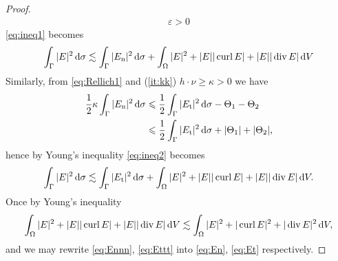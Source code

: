 \begin{proof}
\begin{align*}
    \varepsilon>0
  \end{align*}
  \eqref{eq:ineq1} becomes
  \begin{align}
    \int_{\Gamma}|E|^2\,\text{d}\sigma\lesssim\int_{\Gamma}|E_{\text{n}}|^2\,\text{d}\sigma+\int_{\Omega}|E|^2+|E||\operatorname{curl} E|+|E||\operatorname{div} E|\,\text{d}V
    \label{eq:Ennn}
  \end{align}
  Similarly, from \eqref{eq:Rellich1} and (\ref{it:kk}) $h\cdot\nu\geqslant\kappa>0$  we have
  \begin{equation}\label{eq:ineq2}
    \begin{split}
      \frac{1}{2}\kappa\int_{\Gamma}|E_{\text{n}}|^2\,\text{d}\sigma 
      &\leqslant \frac{1}{2}\int_{\Gamma}|E_{\text{t}}|^2\,\text{d}\sigma-\Theta_1-\Theta_2\\
      &\leqslant\frac{1}{2}\int_{\Gamma}|E_{\text{t}}|^2\,\text{d}\sigma+|\Theta_1|+|\Theta_2|,
    \end{split}
  \end{equation}
  hence by Young's inequality \eqref{eq:ineq2} becomes
  \begin{align}
    \int_{\Gamma}|E|^2\,\text{d}\sigma\lesssim\int_{\Gamma}|E_{\text{t}}|^2\,\text{d}\sigma+\int_{\Omega}|E|^2+|E||\operatorname{curl} E|+|E||\operatorname{div} E|\,\text{d}V
    \label{eq:Ettt}.
  \end{align}
  Once by Young's inequality 
  \begin{align*}
    \int_{\Omega}|E|^2+|E||\operatorname{curl} E|+|E||\operatorname{div} E|\,\text{d}V\lesssim\int_{\Omega}|E|^2+|\operatorname{curl} E|^2+
    |\operatorname{div} E|^2\,\text{d}V,
  \end{align*}
  and we may rewrite \eqref{eq:Ennn}, \eqref{eq:Ettt} into \eqref{eq:En}, 
  \eqref{eq:Et} respectively.
\end{proof}

